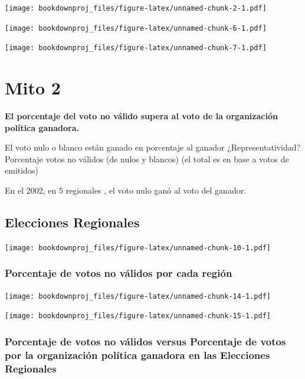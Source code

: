 \documentclass[
]{book}
\theoremstyle{definition}
\theoremstyle{definition}
\theoremstyle{definition}
\theoremstyle{definition}
\theoremstyle{remark}
\begin{document}
\texttt{[image: bookdownproj\_files/figure-latex/unnamed-chunk-2-1.pdf]}

\texttt{[image: bookdownproj\_files/figure-latex/unnamed-chunk-6-1.pdf]}

\texttt{[image: bookdownproj\_files/figure-latex/unnamed-chunk-7-1.pdf]}

\hypertarget{mito2}{%
\chapter{Mito 2}\label{mito2}}

\textbf{El porcentaje del voto no válido supera al voto de la organización política ganadora.}

El voto nulo o blanco están ganado en porcentaje al ganador
¿Representatividad?
Porcentaje votos no válidos (de nulos y blancos) (el total es en base a votos de emitidos)

En el 2002, en 5 regionales , el voto nulo ganó al voto del ganador.

\hypertarget{elecciones-regionales}{%
\section{Elecciones Regionales}\label{elecciones-regionales}}

\texttt{[image: bookdownproj\_files/figure-latex/unnamed-chunk-10-1.pdf]}

\hypertarget{porcentaje-de-votos-no-vuxe1lidos-por-cada-regiuxf3n}{%
\subsection{Porcentaje de votos no válidos por cada región}\label{porcentaje-de-votos-no-vuxe1lidos-por-cada-regiuxf3n}}

\texttt{[image: bookdownproj\_files/figure-latex/unnamed-chunk-14-1.pdf]}

\texttt{[image: bookdownproj\_files/figure-latex/unnamed-chunk-15-1.pdf]}

\hypertarget{porcentaje-de-votos-no-vuxe1lidos-versus-porcentaje-de-votos-por-la-organizaciuxf3n-poluxedtica-ganadora-en-las-elecciones-regionales}{%
\subsection{Porcentaje de votos no válidos versus Porcentaje de votos por la organización política ganadora en las Elecciones Regionales}\label{porcentaje-de-votos-no-vuxe1lidos-versus-porcentaje-de-votos-por-la-organizaciuxf3n-poluxedtica-ganadora-en-las-elecciones-regionales}}
\end{document}
